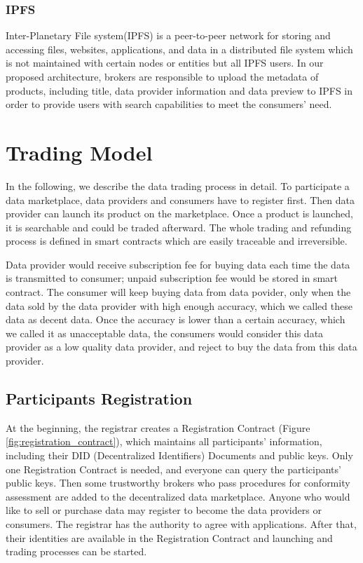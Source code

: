 \documentclass[journal,a4paper]{IEEEtran}
\begin{document}
\subsubsection{IPFS}
Inter-Planetary File system(IPFS)\cite{IPFS} is a peer-to-peer network for storing and accessing files, websites, applications, and data in a distributed file system which is not maintained with certain nodes or entities but all IPFS users. In our proposed architecture, brokers are responsible to upload the metadata of products, including title, data provider information and data preview to IPFS in order to provide users with search capabilities to meet the consumers' need.

\section{Trading Model}
In the following, we describe the data trading process in detail. To participate a data marketplace, data providers and consumers have to register first. Then data provider can launch its product on the marketplace. Once a product is launched, it is searchable and could be traded afterward. The whole trading and refunding process is defined in smart contracts which are easily traceable and irreversible.

Data provider would receive subscription fee for buying data each time the data is transmitted to consumer; unpaid subscription fee would be stored in smart contract. The consumer will keep buying data from data povider, only when the data sold by the data provider with high enough accuracy, which we called these data as decent data.
Once the accuracy is lower than a certain accuracy, which we called it as unacceptable data, the consumers would consider this data provider as a low quality data provider, and reject to buy the data from this data provider.


\subsection{Participants Registration}
At the beginning, the registrar creates a Registration Contract (Figure \ref{fig:registration_contract}), which maintains all participants' information, including their DID (Decentralized Identifiers) Documents and public keys. Only one Registration Contract is needed, and everyone can query the participants' public keys. Then some trustworthy brokers who pass procedures for conformity assessment are added to the decentralized data marketplace. Anyone who would like to sell or purchase data may register to become the data providers or consumers. The registrar has the authority to agree with applications. After that, their identities are available in the Registration Contract and launching and trading processes can be started.
\end{document}
